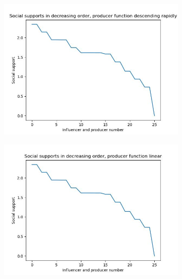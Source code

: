 \documentclass[11pt, letterpaper]{article}
\begin{document}
\begin{figure}[h]
    \centering
\begin{adjustbox}{max width=1.5\textwidth,center}
    \begin{subfigure}[b]{0.45\textwidth}
        \includegraphics[width=\linewidth]{"figures/g/descending rapidly_supps.jpg"}
    \end{subfigure}
    \begin{subfigure}[b]{0.45\textwidth}
        \includegraphics[width=\linewidth]{"figures/g/linear_supps.jpg"}
    \end{subfigure}
    \begin{subfigure}[b]{0.45\textwidth}

\end{subfigure}
\end{adjustbox}
\end{figure}
\end{document}
